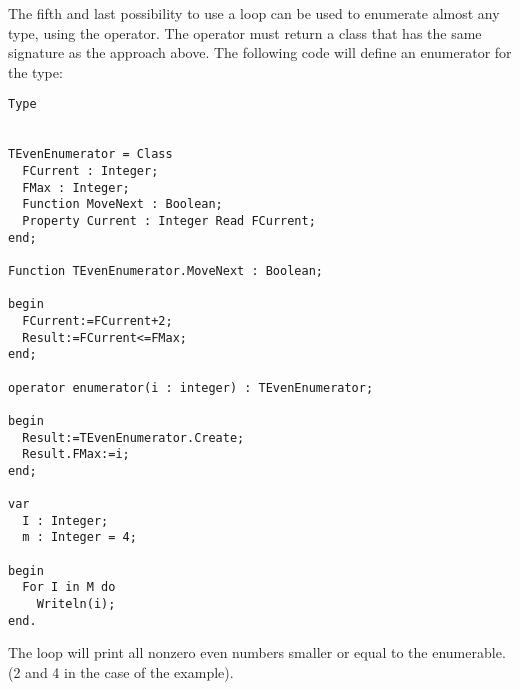 The fifth and last possibility to use a  loop can be used to
enumerate almost any type, using the  operator.
The  operator must return a class that has the same
signature as the  approach above. The following code will
define an enumerator for the  type:
\begin{verbatim}
Type


TEvenEnumerator = Class
  FCurrent : Integer;
  FMax : Integer;
  Function MoveNext : Boolean;
  Property Current : Integer Read FCurrent;
end;

Function TEvenEnumerator.MoveNext : Boolean;

begin
  FCurrent:=FCurrent+2;
  Result:=FCurrent<=FMax;
end;

operator enumerator(i : integer) : TEvenEnumerator;

begin
  Result:=TEvenEnumerator.Create;
  Result.FMax:=i;
end;

var
  I : Integer;
  m : Integer = 4;

begin
  For I in M do
    Writeln(i);
end.
\end{verbatim}
The loop will print all nonzero even numbers smaller or equal to the
enumerable. (2 and 4 in the case of the example).

